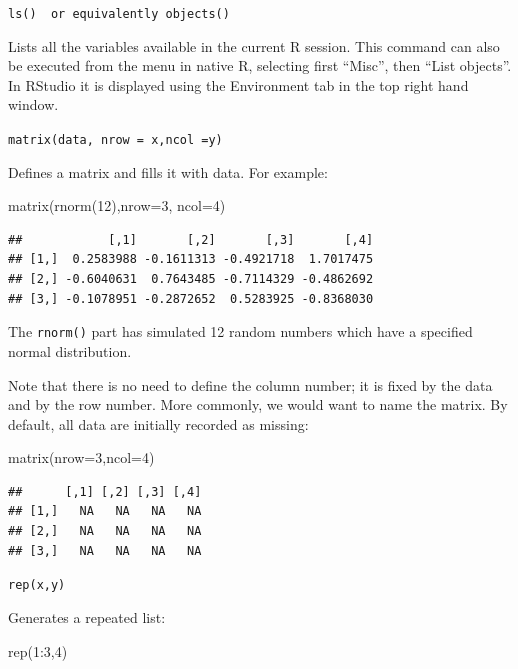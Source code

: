 \documentclass[
]{book}
\newenvironment{Shaded}{\begin{snugshade}}{\end{snugshade}}
\newcommand{\AttributeTok}[1]{\textcolor[rgb]{0.77,0.63,0.00}{#1}}
\newcommand{\DecValTok}[1]{\textcolor[rgb]{0.00,0.00,0.81}{#1}}
\newcommand{\FunctionTok}[1]{\textcolor[rgb]{0.00,0.00,0.00}{#1}}
\newcommand{\NormalTok}[1]{#1}
\newcommand{\SpecialCharTok}[1]{\textcolor[rgb]{0.00,0.00,0.00}{#1}}
\begin{document}
\texttt{ls()\ \ or\ equivalently\ objects()}

Lists all the variables available in the current R session. This command can also be executed from the menu in native R, selecting first ``Misc'', then ``List objects''. In RStudio it is displayed using the Environment tab in the top right hand window.

\texttt{matrix(data,\ nrow\ =\ x,ncol\ =y)}

Defines a matrix and fills it with data. For example:

\begin{Shaded}
\begin{Highlighting}[]
\FunctionTok{matrix}\NormalTok{(}\FunctionTok{rnorm}\NormalTok{(}\DecValTok{12}\NormalTok{),}\AttributeTok{nrow=}\DecValTok{3}\NormalTok{, }\AttributeTok{ncol=}\DecValTok{4}\NormalTok{)}
\end{Highlighting}
\end{Shaded}

\begin{verbatim}
##            [,1]       [,2]       [,3]       [,4]
## [1,]  0.2583988 -0.1611313 -0.4921718  1.7017475
## [2,] -0.6040631  0.7643485 -0.7114329 -0.4862692
## [3,] -0.1078951 -0.2872652  0.5283925 -0.8368030
\end{verbatim}

The \texttt{rnorm()} part has simulated 12 random numbers which have a specified normal distribution.

Note that there is no need to define the column number; it is fixed by the data and by the row number. More commonly, we would want to name the matrix. By default, all data are initially recorded as missing:

\begin{Shaded}
\begin{Highlighting}[]
\FunctionTok{matrix}\NormalTok{(}\AttributeTok{nrow=}\DecValTok{3}\NormalTok{,}\AttributeTok{ncol=}\DecValTok{4}\NormalTok{)}
\end{Highlighting}
\end{Shaded}

\begin{verbatim}
##      [,1] [,2] [,3] [,4]
## [1,]   NA   NA   NA   NA
## [2,]   NA   NA   NA   NA
## [3,]   NA   NA   NA   NA
\end{verbatim}

\texttt{rep(x,y)}

Generates a repeated list:

\begin{Shaded}
\begin{Highlighting}[]
\FunctionTok{rep}\NormalTok{(}\DecValTok{1}\SpecialCharTok{:}\DecValTok{3}\NormalTok{,}\DecValTok{4}\NormalTok{)}
\end{Highlighting}
\end{Shaded}
\end{document}
